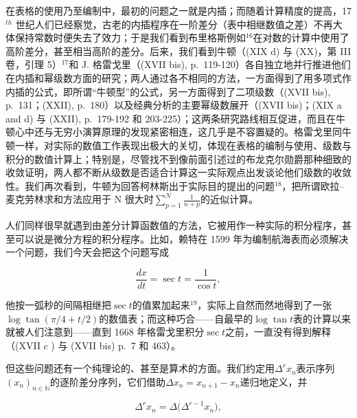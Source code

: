 在表格的使用乃至编制中，最初的问题之一就是内插；而随着计算精度的提高，17\(^{th}\) 世纪人们已经察觉，古老的内插程序在一阶差分（表中相继数值之差）不再大体保持常数时便失去了效力；于是我们看到布里格斯例如\({}^{16}\)在对数的计算中使用了高阶差分，甚至相当高阶的差分。后来，我们看到牛顿（(XIX d) 与 (XX)，第 III 卷，引理 5）\({}^{17}\)和 J. 格雷戈里（(XVII bis), p.~119-120）各自独立地并行推进他们在内插和幂级数方面的研究；两人通过各不相同的方法，一方面得到了用多项式作内插的公式，即所谓“牛顿型”的公式，另一方面得到了二项级数（(XVII bis), p.~131；(XXII), p.~180）以及经典分析的主要幂级数展开（(XVII bis)；(XIX a and d) 与 (XXII), p.~179-192 和 203-225）；这两条研究路线相互促进，而且在牛顿心中还与无穷小演算原理的发现紧密相连，这几乎是不容置疑的。格雷戈里同牛顿一样，对实际的数值工作表现出极大的关切，体现在表格的编制与使用、级数与积分的数值计算上；特别是，尽管找不到像前面引述过的布龙克尔勋爵那种细致的收敛证明，两人都不断从级数是否适合计算这一实际观点出发谈论他们级数的收敛性。我们再次看到，牛顿为回答柯林斯出于实际目的提出的问题\({}^{18}\)，把所谓欧拉–麦克劳林求和方法应用于 N 很大时\(\sum_{p=1}^{N}\frac{1}{n+p}\)的近似计算。

人们同样很早就遇到由差分计算函数值的方法，它被用作一种实际的积分程序，甚至可以说是微分方程的积分程序。比如，赖特在 1599 年为编制航海表而必须解决一个问题，我们今天会把这个问题写成

\[
{\frac {d x}{d t}} = \sec t = {\frac {1}{\cos t}},
\]

他按一弧秒的间隔相继把\(\sec t\)的值累加起来\(^{19}\)，实际上自然而然地得到了一张\(\log \tan (\pi / 4 + t / 2)\)的数值表；而这种巧合——自最早的\(\log \tan t\)表的计算以来就被人们注意到——直到 1668 年格雷戈里积分\(\sec t\)之前，一直没有得到解释（(XVII \(c\) ) 与 (XVII bis) p.~7 和 463）。

但这些问题还有一个纯理论的、甚至是算术的方面。我们约定用\(\Delta^{r}x_{n}\)表示序列\((x_{n})_{n\in\mathbb{N}}\)的逐阶差分序列，它们借助\(\Delta x_{n}=x_{n+1}-x_{n}\)递归地定义，并

\[
\varDelta^ {r} x _ {n} = \varDelta \big (\varDelta^ {r - 1} x _ {n} \big),
\]

